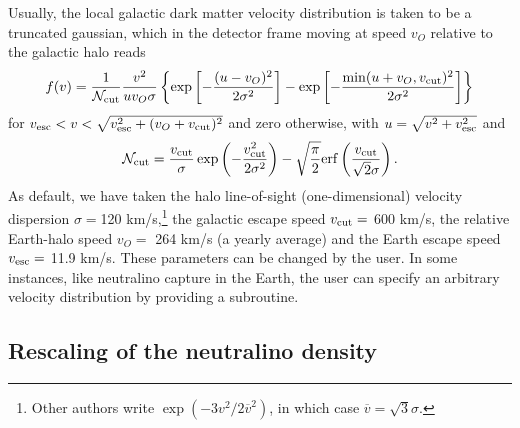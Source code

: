 Usually, the local galactic dark matter velocity distribution is taken
to be a truncated gaussian, which in the detector frame moving at
speed $v_O$ relative to the galactic halo reads
\begin{equation}
   f(v) = {1\over {\mathcal N}_{\rm cut}} { v^2 \over u v_O \sigma} \left\{
   \exp\left[{-{(u-v_O)^2\over2\sigma^2}}\right] -
   \exp\left[{-{\min(u+v_O,v_{\rm cut})^2\over2\sigma^2}}\right]
   \right\}
\end{equation}
for $ v_{\rm esc} < v < \sqrt{v_{\rm esc}^2 + (v_O + v_{\rm cut} ) ^2
} $ and zero otherwise, with $ u = \sqrt{v^2 + v_{\rm esc}^2} $ and
\begin{equation}
   {\mathcal N}_{\rm cut} =
   {v_{\rm cut}\over\sigma} \exp\left( {-{v_{\rm cut}^2\over2\sigma^2}} \right)
   -
   \sqrt{\pi\over2} {\rm erf} \left( {v_{\rm cut}\over\sqrt{2}\sigma} \right) .
\end{equation}
As default, we have taken the halo line-of-sight (one-dimensional) velocity
dispersion $\sigma = $120 km/s,\footnote{Other authors write
   $\exp(-3v^2/2\overline{v}^2)$, in which case $\overline{v} = \sqrt{3}
   \sigma$.}  the galactic escape speed $ v_{\rm cut} = $ 600 km/s, the relative
Earth-halo speed $ v_O = $ 264 km/s (a yearly average) and the Earth escape
speed $ v_{\rm esc} = $ 11.9 km/s. These parameters can be changed by
the user. In some instances, like neutralino capture in the
Earth, the user can specify an arbitrary velocity distribution by
providing a subroutine.

\subsection{Rescaling of the neutralino density}
\label{sec:rescale}

